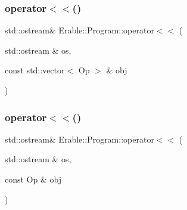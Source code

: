 \mbox{\label{namespace_erable_1_1_program_aad85b78064a3b7131195533b32457c33}} 
\subsubsection{\texorpdfstring{operator$<$$<$()}{operator<<()}\hspace{0.1cm}{\footnotesize\ttfamily [2/3]}}
{\footnotesize\ttfamily std\+::ostream\& Erable\+::\+Program\+::operator$<$$<$ (\begin{DoxyParamCaption}\item[{std\+::ostream \&}]{os,  }\item[{const std\+::vector$<$ Op $>$ \&}]{obj }\end{DoxyParamCaption})}

\mbox{\label{namespace_erable_1_1_program_a502e6950d7c128219314cce6a7849dfa}} 
\subsubsection{\texorpdfstring{operator$<$$<$()}{operator<<()}\hspace{0.1cm}{\footnotesize\ttfamily [3/3]}}
{\footnotesize\ttfamily std\+::ostream\& Erable\+::\+Program\+::operator$<$$<$ (\begin{DoxyParamCaption}\item[{std\+::ostream \&}]{os,  }\item[{const Op \&}]{obj }\end{DoxyParamCaption})}

